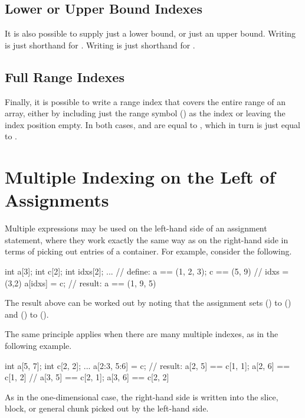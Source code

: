 \subsection{Lower or Upper Bound Indexes}

It is also possible to supply just a lower bound, or just an upper
bound.  Writing  is just shorthand for
.  Writing  is just shorthand for
.

\subsection{Full Range Indexes}

Finally, it is possible to write a range index that covers the entire
range of an array, either by including just the range symbol
(\code{:}) as the index or leaving the index position empty. In both
cases,  and  are equal to ,
which in turn is just equal to .

\section{Multiple Indexing on the Left of Assignments}

Multiple expressions may be used on the left-hand side of an
assignment statement, where they work exactly the same way as on the
right-hand side in terms of picking out entries of a container.
For example, consider the following.
%
\begin{stancode}
int a[3];
int c[2];
int idxs[2];
...             // define: a == (1, 2, 3);  c == (5, 9)
                //         idxs = (3,2)
a[idxs] = c;   // result: a == (1, 9, 5)
\end{stancode}
%
The result above can be worked out by noting that the assignment sets
 () to  () and
 () to  ().

The same principle applies when there are many multiple indexes, as
in the following example.
%
\begin{stancode}
int a[5, 7];
int c[2, 2];
...
a[2:3, 5:6] = c;  // result: a[2, 5] == c[1, 1];  a[2, 6] == c[1, 2]
                   //         a[3, 5] == c[2, 1];  a[3, 6] == c[2, 2]
\end{stancode}
%
As in the one-dimensional case, the right-hand side is written into
the slice, block, or general chunk picked out by the left-hand side.

